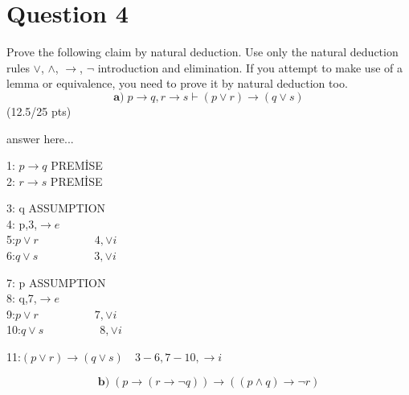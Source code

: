 \documentclass[a4paper,12pt]{article}
\newcommand\tab[1][1cm]{\hspace*{#1}}
\begin{document}
\section*{Question 4 \hfill {}}
\tab Prove the following claim by natural deduction. Use only the natural deduction rules $\vee$, $\wedge$, $\rightarrow$, $\neg$ introduction and elimination. If you attempt to make use of a lemma or equivalence, you need to prove it by natural deduction too.
\begin{equation*}
    \textbf{a)} \; p \rightarrow q, r \rightarrow s \vdash (p \vee r) \rightarrow (q \vee s)
\end{equation*}
\hfill \small{(12.5/25 pts)}\\
\begin{tcolorbox}
answer here...\\
\begin{tcolorbox}
1: $p \rightarrow q$ \quad\quad\quad\quad\quad PREMİSE \\
2: $r \rightarrow s$ \quad\quad\quad\quad\quad PREMİSE \\
\begin{tcolorbox}
3: q \quad \quad \quad\quad\quad\quad\quad ASSUMPTION \\
4: p\quad \quad \quad\quad\quad\quad{},3,$\rightarrow e$\\
5:$p\lor r \quad \quad\quad\quad\quad 4,\lor i$\\
6:$q\lor s \quad \quad\quad\quad\quad 3,\lor i$\\
\end{tcolorbox}
\begin{tcolorbox}
7: p \quad \quad \quad\quad\quad\quad\quad ASSUMPTION \\
8: q\quad \quad \quad\quad\quad\quad{},7,$\rightarrow e$\\
9:$p\lor r \quad \quad\quad\quad\quad 7,\lor i$\\
10:$q\lor s \quad \quad\quad\quad\quad 8,\lor i$\\
\end{tcolorbox}
11:$(p\lor r)\rightarrow (q\lor s) \quad 3-6,7-10,\rightarrow i$
\end{tcolorbox}
\vspace{1cm} %
\end{tcolorbox}
\begin{equation*}
     \textbf{b)} \;  (p \rightarrow (r \rightarrow \neg q)) \rightarrow ((p \wedge q) \rightarrow \neg r)
\end{equation*}
\end{document}
